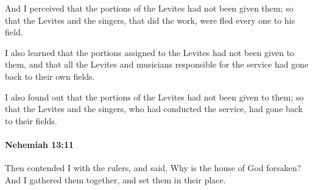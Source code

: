 			\begin{versebox}
					\item[BHS] 
					\item[LXX] 
					\item[ASV] And I perceived that the portions of the Levites had not been given them; so that the Levites and the singers, that did the work, were fled every one to his field.
					\item[NIV] I also learned that the portions assigned to the Levites had not been given to them, and that all the Levites and musicians responsible for the service had gone back to their own fields.
					\item[NRSV] I also found out that the portions of the Levites had not been given to them; so that the Levites and the singers, who had conducted the service, had gone back to their fields.
			\end{versebox}

		\paragraph{Nehemiah 13:11} %
			\label{NEHEMIAH-13-11}

			Then contended I with the rulers, and said, Why is the house of God forsaken? And I gathered them together, and set them in their place.

